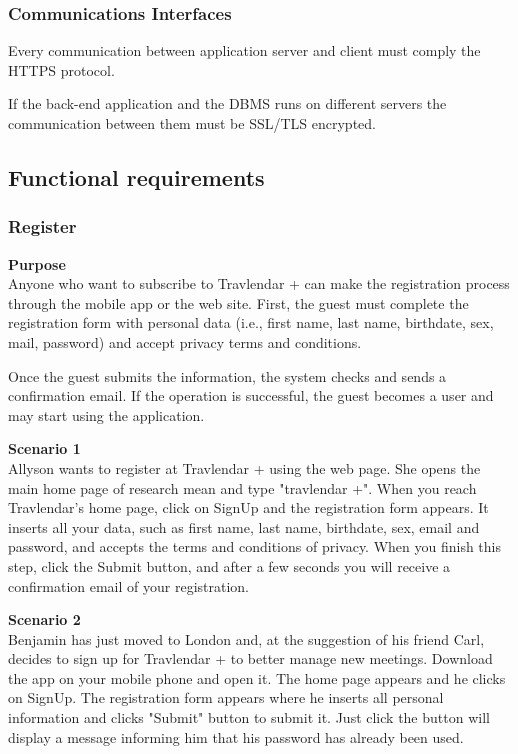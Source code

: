 \documentclass{article}
\begin{document}
	
	\subsubsection{Communications Interfaces}
	Every communication between application server and client must comply the HTTPS protocol.
	
	\bigskip
	If the back-end application and the DBMS runs on different servers the communication between them must be SSL/TLS encrypted.
	
	
	\subsection{Functional requirements}
	
	
	\subsubsection{Register}
	
	\bigskip
	\noindent
	\textbf{Purpose} \\
	Anyone who want to subscribe to Travlendar + can make the registration process through the mobile app or the web site.
First, the guest must complete the registration form with personal data (i.e., first name, last name, birthdate, sex, mail, password) and accept privacy terms and conditions.

	Once the guest submits the information, the system checks and sends a confirmation email. If the operation is successful, the guest becomes a user and may start using the application.
	
	\bigskip
	\noindent
	\textbf{Scenario 1} \\
	Allyson wants to register at Travlendar + using the web page. She opens the main home page of research mean and type "travlendar +". When you reach Travlendar's home page, click on SignUp and the registration form appears. It inserts all your data, such as first name, last name, birthdate, sex, email and password, and accepts the terms and conditions of privacy. When you finish this step, click the Submit button, and after a few seconds you will receive a confirmation email of your registration.

	\bigskip
	\noindent
	\textbf{Scenario 2} \\
	Benjamin has just moved to London and, at the suggestion of his friend Carl, decides to sign up for Travlendar + to better manage new meetings. Download the app on your mobile phone and open it. The home page appears and he clicks on SignUp. The registration form appears where he inserts all personal information and clicks "Submit" button to submit it. Just click the button will display a message informing him that his password has already been used.
	
\end{document}
